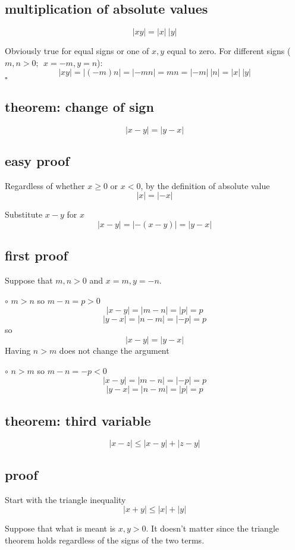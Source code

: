 \documentclass[11pt, oneside]{article}
\begin{document}
\subsection*{multiplication of absolute values}
\[ |xy| = |x| \ |y| \]

Obviously true for equal signs or one of $x,y$ equal to zero.  For different signs ($m,n > 0; \ \ x = -m, y = n$):
\[ |xy| = |(-m)n| = |-mn| = mn = |-m| \ |n| = |x| \ |y| \]
$\square$

\subsection*{theorem:  change of sign}
\[ |x - y| = |y - x| \]

\subsection*{easy proof}

Regardless of whether $x \ge 0$ or $x < 0$, by the definition of absolute value
\[ |x| = |-x| \]

Substitute $x - y$ for $x$
\[ |x - y| = |-(x - y)| = |y - x| \]

\subsection*{first proof}
Suppose that $m,n > 0$ and $x = m, y =-n$.

$\circ$  $m > n$ so $m - n = p > 0$
\[ |x - y| = |m - n| = |p| = p \]
\[ |y - x| = |n - m| = |-p| = p \]
so
\[ |x - y| = |y - x| \]
Having $n > m$ does not change the argument

$\circ$  $n > m$ so $m - n = -p < 0$
\[ |x - y| = |m - n| = |-p| = p \]
\[ |y - x| = |n - m| = |p| = p \]

\subsection*{theorem:  third variable}
\[ |x - z|  \le |x - y| + |z - y| \]

\subsection*{proof}
Start with the triangle inequality
\[ |x + y| \le |x| + |y| \]

Suppose that what is meant is $x,y > 0$.  It doesn't matter since the triangle theorem holds regardless of the signs of the two terms.
\end{document}
